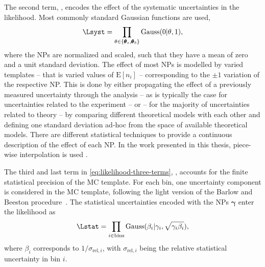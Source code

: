 The second term, \Lsyst, encodes the effect of the systematic uncertainties in the likelihood. Most commonly standard Gaussian functions are used,
\begin{equation}
    \Lsyst = \prod_{\theta \in \{ \pmb{\theta}_s,\pmb{\theta}_b \}} \text{Gauss}(0 | \theta, 1),
\end{equation}
where the NPs are normalized and scaled, such that they have a mean of zero and a unit standard deviation.
The effect of most NPs is modelled by varied templates -- that is varied values of $\text{E}[n_i]$ -- corresponding to the $\pm 1$ variation of the respective NP. This is done by either propagating the effect of a previously measured uncertainty through the analysis -- as is typically the case for uncertainties related to the experiment -- or -- for the majority of uncertainties related to theory -- by comparing different theoretical models with each other and defining one standard deviation ad-hoc from the space of available theoretical models.
There are different statistical techniques to provide a continuous description of the effect of each NP.
In the work presented in this thesis, piece-wise interpolation is used .

The third and last term in \cref{eq:likelihood-three-terms}, \Lstat, accounts for the finite statistical precision of the MC template. For each bin, one uncertainty component is considered in the MC template, following the light version of the Barlow and Beeston procedure~\cite{BARLOW1993219}. 
The statistical uncertainties encoded with the NPs $\pmb{\gamma}$ enter the likelihood as
\begin{equation}
    \Lstat = \prod_{i \in \text{bins}} \text{Gauss}(\beta_i | \gamma_i, \sqrt{\gamma_i \beta_i}),    
\end{equation}
where $\beta_i$ corresponds to $1 / \sigma_{\text{rel}, i}$, with $\sigma_{\text{rel}, i}$ being the relative statistical uncertainty in bin $i$. 


